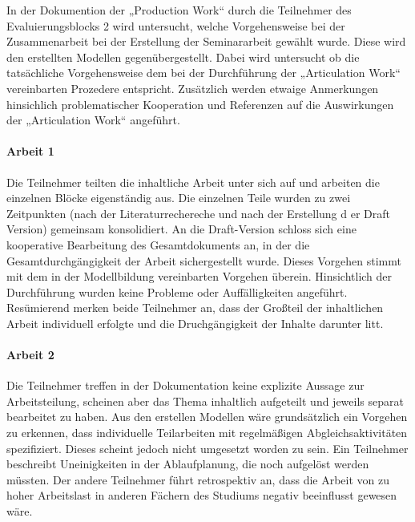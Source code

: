 In der Dokumention der „Production Work“ durch die Teilnehmer des Evaluierungsblocks 2 wird untersucht, welche Vorgehensweise bei der Zusammenarbeit bei der Erstellung der Seminararbeit gewählt wurde. Diese wird den erstellten Modellen gegenübergestellt. Dabei wird untersucht ob die tatsächliche Vorgehensweise dem bei der Durchführung der „Articulation Work“ vereinbarten Prozedere entspricht. Zusätzlich werden etwaige Anmerkungen hinsichlich problematischer Kooperation und Referenzen auf die Auswirkungen der „Articulation Work“ angeführt.

\paragraph{Arbeit 1} %
\label{par:arbeit_1}

Die Teilnehmer teilten die inhaltliche Arbeit unter sich auf und arbeiten die einzelnen Blöcke eigenständig aus. Die einzelnen Teile wurden zu zwei Zeitpunkten (nach der Literaturrechereche und nach der Erstellung d er Draft Version) gemeinsam konsolidiert. An die Draft-Version schloss sich eine kooperative Bearbeitung des Gesamtdokuments an, in der die Gesamtdurchgängigkeit der Arbeit sichergestellt wurde. Dieses Vorgehen stimmt mit dem in der Modellbildung vereinbarten Vorgehen überein. Hinsichtlich der Durchführung wurden keine Probleme oder Auffälligkeiten angeführt. Resümierend merken beide Teilnehmer an, dass der Großteil der inhaltlichen Arbeit individuell erfolgte und die Druchgängigkeit der Inhalte darunter litt.


\paragraph{Arbeit 2} %
\label{par:arbeit_2}

Die Teilnehmer treffen in der Dokumentation keine explizite Aussage zur Arbeitsteilung, scheinen aber das Thema inhaltlich aufgeteilt und jeweils separat bearbeitet zu haben. Aus den erstellen Modellen wäre grundsätzlich ein Vorgehen zu erkennen, dass individuelle Teilarbeiten mit regelmäßigen Abgleichsaktivitäten spezifiziert. Dieses scheint jedoch nicht umgesetzt worden zu sein. Ein Teilnehmer beschreibt Uneinigkeiten in der Ablaufplanung, die noch aufgelöst werden müssten. Der andere Teilnehmer führt retrospektiv an, dass die Arbeit von zu hoher Arbeitslast in anderen Fächern des Studiums negativ beeinflusst gewesen wäre.  

